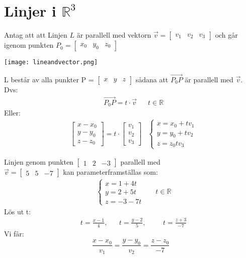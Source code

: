 \section{Linjer i $\mathbb{R}^3$} %
\label{sec:linjer_i_}
Antag att att Linjen $L$ är parallell med vektorn $\vec{v} = \begin{bmatrix} v_1&v_2&v_3 \end{bmatrix}$ och går igenom punkten $P_0 = \begin{bmatrix} x_0&y_0&z_0 \end{bmatrix}$
\begin{center}
    \texttt{[image: lineandvector.png]}
\end{center}
L består av alla punkter P = $\begin{bmatrix} x&y&z \end{bmatrix}$ sådana att $\overrightarrow{P_0P}$ är parallell med $\vec{v}$. \\
\newpage
\noindent
Dvs:
\begin{align*}
&\overrightarrow{P_0P} = t \cdot \vec{v} &&t\in \mathbb{R}
\end{align*}
Eller:
\begin{align*}
&\begin{bmatrix} x-x_0\\y-y_0\\z-z_0 \end{bmatrix} = t \cdot \begin{bmatrix} v_1\\v_2\\v_3 \end{bmatrix} &\begin{cases} x = x_0 + tv_1\\y=y_0+tv_2\\z=z_0tv_3 \end{cases}
\end{align*}
\begin{Ex}
    Linjen genom punkten $\begin{bmatrix} 1&2&-3 \end{bmatrix}$ parallell med \\ $\vec{v} = \begin{bmatrix} 5&5&-7 \end{bmatrix}$ kan parameterframställas som:
    \begin{align*}
    &\begin{cases}
        x=1+4t\\y=2+5t\\z=-3-7t
    \end{cases}
    &&t\in \mathbb{R}
    \end{align*}
    Lös ut t:
    \begin{align*}
    &t=\frac{x-1}{4}, &&t=\frac{y-2}{5}, &&&t=\frac{z+3}{-7}
    \end{align*}
    Vi får:
    \[
        \frac{x-x_0}{v_1} = \frac{y-y_0}{v_2} = \frac{z-z_0}{-7}
    \]
\end{Ex}
